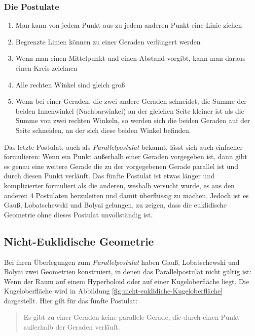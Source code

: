 \subsubsection{Die Postulate}
\begin{enumerate}
	\item Man kann von jedem Punkt aus zu jedem anderen Punkt eine Linie ziehen
	\item Begrenzte Linien können zu einer Geraden verlängert werden
	\item Wenn man einen Mittelpunkt und einen Abstand vorgibt, kann man daraus einen Kreis zeichnen
	\item Alle rechten Winkel sind gleich groß
	\item Wenn bei einer Geraden, die zwei andere Geraden schneidet, die Summe der beiden Innenwinkel (Nachbarwinkel) an der gleichen Seite kleiner ist als die Summe von zwei rechten Winkeln, so werden sich die beiden Geraden auf der Seite schneiden, an der sich diese beiden Winkel befinden.
\end{enumerate}

Das letzte Postulat, auch als \textit{\glqq{}Parallelpostulat\grqq{}} bekannt, lässt sich auch einfacher formulieren: Wenn ein Punkt außerhalb einer Geraden vorgegeben ist, dann gibt es genau eine weitere Gerade die zu der vorgegebenen Gerade parallel ist und durch diesen Punkt verläuft. Das fünfte Postulat ist etwas länger und komplizierter formuliert als die anderen, weshalb versucht wurde, es aus den anderen 4 Postulaten herzuleiten und damit überflüssig zu machen. Jedoch ist es Gauß, Lobatschewski und Bolyai gelungen, zu zeigen, dass die euklidische Geometrie ohne dieses Postulat unvollständig ist.

\subsection{Nicht-Euklidische Geometrie}

Bei ihren Überlegungen zum \textit{Parallelpostulat} haben Gauß, Lobatschewski und Bolyai zwei Geometrien konstruiert, in denen das Parallelpostulat nicht gültig ist: Wenn der Raum auf einem Hyperboloid oder auf einer Kugeloberfläche liegt. Die Kugeloberfläche wird in Abbildung \ref{fig:nicht-euklidiche-Kugeloberfläche} dargestellt. Hier gilt für das fünfte Postulat:
\begin{quote}
Es gibt zu einer Geraden keine parallele Gerade, die durch einen Punkt außerhalb der Geraden verläuft.
\end{quote}

